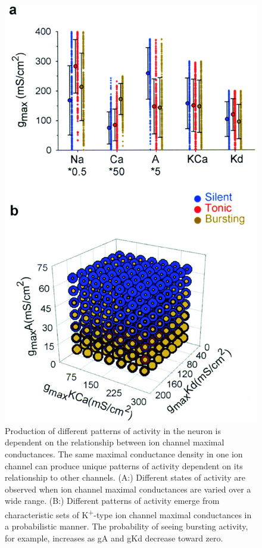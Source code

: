 \begin{figure}[h]
    \centering
    \includegraphics[scale=0.3]{gfx/goldman2001.jpg}
\caption[Dependence of different patterns of activity on ion channel relationships.]{Production of different patterns of activity in the neuron is dependent on the relationship between ion channel maximal conductances. The same maximal conductance density in one ion channel can produce unique patterns of activity dependent on its relationship to other channels. (\textsc{A:}) Different states of activity are observed when ion channel maximal conductances are varied over a wide range. (\textsc{B:}) Different patterns of activity emerge from characteristic sets of K\textsuperscript{+}-type ion channel maximal conductances in a probabilistic manner. The probability of seeing bursting activity, for example, increases as \ac{gA} and \ac{gKd} decrease toward zero\cite{goldman_global_2001}.}
    \label{fig:goldman2005}
\end{figure}


